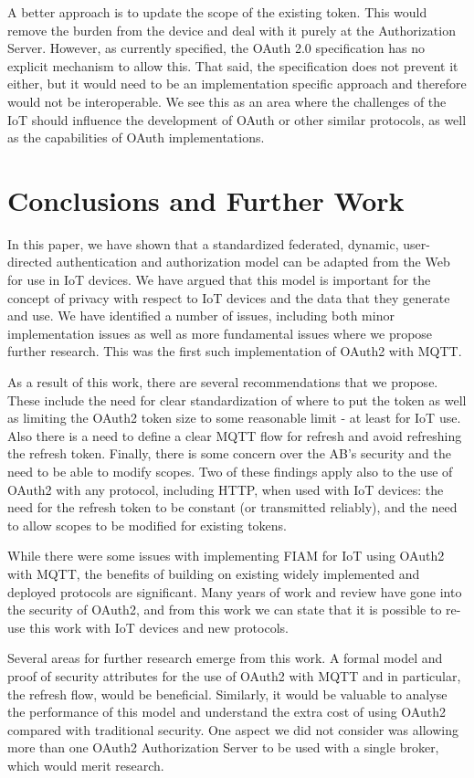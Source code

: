 \documentclass{llncs}
\begin{document}
A better approach is to update the scope of the existing token. This would remove the burden 
from the device and deal with it purely at the Authorization Server. However, as
currently specified, the OAuth 2.0 specification has no explicit mechanism to allow this. That said, 
the specification does not prevent it either, but it would need to be an implementation specific 
approach and therefore would not be interoperable. We see this as an area where the 
challenges of the IoT should influence the development of OAuth or other similar 
protocols, as well as the capabilities of OAuth implementations.

\section{Conclusions and Further Work}\label{sect:conc}
In this paper, we have shown that a standardized federated, dynamic, user-directed authentication and authorization model
can be adapted from the Web for use in IoT devices. We have argued that this model
is important for the concept of privacy with respect to IoT devices and the data that they 
generate and use. We have identified a number of issues, including both minor implementation issues as 
well as more fundamental issues where we propose further research. This was 
the first such implementation of OAuth2 with MQTT.

As a result of this work, there are several recommendations that we propose.  These include the need for clear standardization of where to put the token as well as limiting the OAuth2 token size to some reasonable limit - at least for IoT use. Also there is a need to define a clear MQTT flow for refresh and avoid refreshing the refresh token. Finally, there is some concern over the AB's security and the need to be able to modify scopes.  Two of these findings apply also to the use of OAuth2 with any protocol, including HTTP, when used with IoT devices: the need for the refresh token to be constant (or transmitted reliably), and the need to allow scopes to be modified for existing tokens. 

While there were some issues with implementing FIAM for IoT using OAuth2 with MQTT, the benefits of building on existing widely implemented and deployed protocols are significant. Many years of work and review have gone into the security of OAuth2, and from this work we can state that it is possible to re-use this work with IoT devices and new protocols.

Several areas for further research emerge from this work. A formal model and proof of security attributes for the use of OAuth2 with MQTT and in particular, the refresh flow, would be beneficial. Similarly, it would be valuable to analyse the performance of this model and understand the extra cost of using OAuth2 compared with traditional security. One aspect we did not consider was allowing more than one OAuth2 Authorization Server to be used with a single broker, which would merit research.
\end{document}
